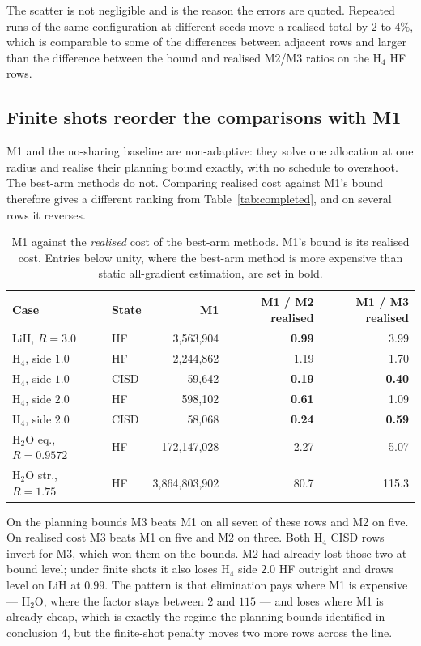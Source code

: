 \documentclass[10pt]{article}
\begin{document}
The scatter is not negligible and is the reason the errors are quoted. Repeated runs of the same configuration at different seeds move a realised total by $2$ to $4\%$, which is comparable to some of the differences between adjacent rows and larger than the difference between the bound and realised M2/M3 ratios on the H$_4$ HF rows.

\subsection{Finite shots reorder the comparisons with M1}
\label{sec:m1-finite}

M1 and the no-sharing baseline are non-adaptive: they solve one allocation at one
radius and realise their planning bound exactly, with no schedule to overshoot.
The best-arm methods do not. Comparing realised cost against M1's bound therefore
gives a different ranking from Table~\ref{tab:completed}, and on several rows it
reverses.

\begin{table}[!htbp]
\centering
\scriptsize
\caption{M1 against the \emph{realised} cost of the best-arm methods. M1's bound is its realised cost. Entries below unity, where the best-arm method is more expensive than static all-gradient estimation, are set in bold.}
\label{tab:m1-finite}
\begin{tabular}{llrrr}
\toprule
Case & State & M1 & M1 / M2 realised & M1 / M3 realised \\
\midrule
LiH, $R{=}3.0$ & HF & 3,563,904 & \textbf{0.99} & 3.99 \\
H$_4$, side $1.0$ & HF & 2,244,862 & 1.19 & 1.70 \\
H$_4$, side $1.0$ & CISD & 59,642 & \textbf{0.19} & \textbf{0.40} \\
H$_4$, side $2.0$ & HF & 598,102 & \textbf{0.61} & 1.09 \\
H$_4$, side $2.0$ & CISD & 58,068 & \textbf{0.24} & \textbf{0.59} \\
H$_2$O eq., $R{=}0.9572$ & HF & 172,147,028 & 2.27 & 5.07 \\
H$_2$O str., $R{=}1.75$ & HF & 3,864,803,902 & 80.7 & 115.3 \\
\bottomrule
\end{tabular}
\end{table}

On the planning bounds M3 beats M1 on all seven of these rows and M2 on five. On
realised cost M3 beats M1 on five and M2 on three. Both H$_4$ CISD rows invert for M3, which won them on the bounds. M2 had already
lost those two at bound level; under finite shots it also loses H$_4$ side $2.0$
HF outright and draws level on LiH at $0.99$. The pattern is that elimination pays
where M1 is expensive --- H$_2$O, where the factor stays between $2$ and $115$ ---
and loses where M1 is already cheap, which is exactly the regime the planning
bounds identified in conclusion 4, but the finite-shot penalty moves two more rows
across the line.
\end{document}
